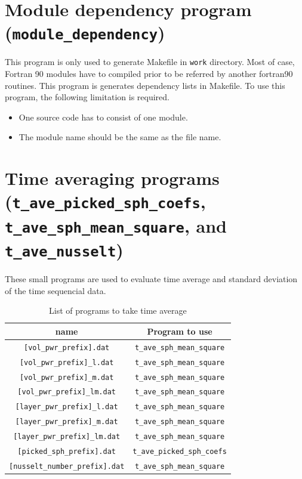 \section{Module dependency program ({\tt module\_dependency})}
This program is only used to generate Makefile in {\tt work} directory. Most of case, Fortran 90 modules have to compiled prior to be referred by another fortran90 routines. This program is generates dependency lists in Makefile. To use this program, the following limitation is required.
\begin{itemize}
\item One source code has to consist of one module.
\item The module name should be the same as the file name.
\end{itemize}

\section{Time averaging programs ({\tt t\_ave\_picked\_sph\_coefs}, {\tt t\_ave\_sph\_mean\_square}, and {\tt t\_ave\_nusselt})}
These small programs are used to evaluate time average and standard deviation of the time sequencial data.
%
\begin{table}[htp]
\caption{List of programs to take time average}
\begin{center} 
\begin{tabular}{|c|c|}
\hline
 name & Program to use \\ \hline \hline
\verb|[vol_pwr_prefix].dat| & \verb|t_ave_sph_mean_square|  \\ \hline
\verb|[vol_pwr_prefix]_l.dat| & \verb|t_ave_sph_mean_square|  \\
\verb|[vol_pwr_prefix]_m.dat| & \verb|t_ave_sph_mean_square|  \\
\verb|[vol_pwr_prefix]_lm.dat| & \verb|t_ave_sph_mean_square|  \\ \hline
\verb|[layer_pwr_prefix]_l.dat| & \verb|t_ave_sph_mean_square|  \\
\verb|[layer_pwr_prefix]_m.dat| & \verb|t_ave_sph_mean_square|  \\
\verb|[layer_pwr_prefix]_lm.dat| & \verb|t_ave_sph_mean_square|  \\ \hline
\verb|[picked_sph_prefix].dat| & \verb|t_ave_picked_sph_coefs|    \\ \hline
\verb|[nusselt_number_prefix].dat| & \verb|t_ave_sph_mean_square|   \\ \hline
\end{tabular}
\end{center}
\label{table:time_averages}
\end{table}
%



